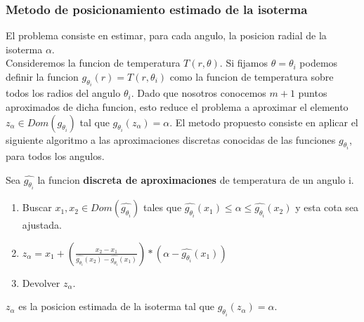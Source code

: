 \subsubsection{Metodo de posicionamiento estimado de la isoterma}
El problema consiste en estimar, para cada angulo, la posicion radial de la isoterma \texttt{$\alpha$}.\\
Consideremos la funcion de temperatura $T(r,\theta)$. Si fijamos $\theta = \theta_i$ podemos definir la funcion $g_{\theta_i}(r) = T(r,\theta_i)$ como la funcion de temperatura sobre todos los radios del angulo $\theta_i$. Dado que nosotros conocemos $m+1$ puntos aproximados de dicha funcion, esto reduce el problema a aproximar el elemento $ z_\alpha \in Dom(g_{\theta_i}) $ tal que $g_{\theta_i}(z_\alpha) = \alpha$. El metodo propuesto consiste en aplicar el siguiente algoritmo a las aproximaciones discretas conocidas de las funciones $g_{\theta_i}$, para todos los angulos.
\begin{theorem}
    Sea $\hat{g_{\theta_i}}$ la funcion \textbf{discreta de aproximaciones} de temperatura de un angulo i.
    \begin{enumerate}
        \item Buscar $ x_1, x_2 \in Dom(\hat{g_{\theta_i}}) $ tales que $ \hat{g_{\theta_i}}(x_1) \leq \alpha \leq \hat{g_{\theta_i}}(x_2)$ y esta cota sea ajustada.
        
        \item $z_\alpha = x_1 + \left(\frac{x_2 - x_1}{\hat{g_{\theta_i}}(x_2) - \hat{g_{\theta_i}}(x_1)}\right) * (\alpha - \hat{g_{\theta_i}}(x_1))$

        \item Devolver $z_\alpha$.
    \end{enumerate}
    $z_\alpha$ es la posicion estimada de la isoterma tal que $g_{\theta_i}(z_\alpha) = \alpha$.
\end{theorem}

